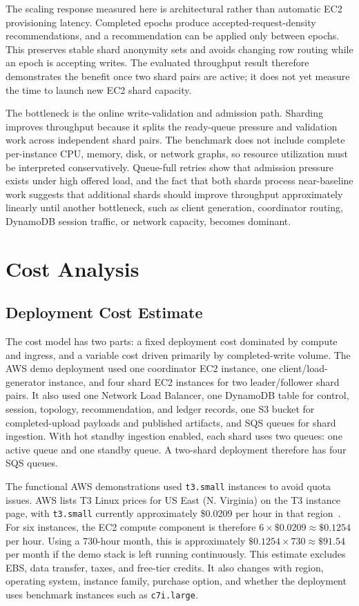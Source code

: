 \documentclass[conference]{IEEEtran}
\begin{document}
The scaling response measured here is architectural rather than automatic EC2 provisioning latency. Completed epochs produce accepted-request-density recommendations, and a recommendation can be applied only between epochs. This preserves stable shard anonymity sets and avoids changing row routing while an epoch is accepting writes. The evaluated throughput result therefore demonstrates the benefit once two shard pairs are active; it does not yet measure the time to launch new EC2 shard capacity.

The bottleneck is the online write-validation and admission path. Sharding improves throughput because it splits the ready-queue pressure and validation work across independent shard pairs. The benchmark does not include complete per-instance CPU, memory, disk, or network graphs, so resource utilization must be interpreted conservatively. Queue-full retries show that admission pressure exists under high offered load, and the fact that both shards process near-baseline work suggests that additional shards should improve throughput approximately linearly until another bottleneck, such as client generation, coordinator routing, DynamoDB session traffic, or network capacity, becomes dominant.

\section{Cost Analysis}

\subsection{Deployment Cost Estimate}

The cost model has two parts: a fixed deployment cost dominated by compute and ingress, and a variable cost driven primarily by completed-write volume. The AWS demo deployment used one coordinator EC2 instance, one client/load-generator instance, and four shard EC2 instances for two leader/follower shard pairs. It also used one Network Load Balancer, one DynamoDB table for control, session, topology, recommendation, and ledger records, one S3 bucket for completed-upload payloads and published artifacts, and SQS queues for shard ingestion. With hot standby ingestion enabled, each shard uses two queues: one active queue and one standby queue. A two-shard deployment therefore has four SQS queues.

The functional AWS demonstrations used \texttt{t3.small} instances to avoid quota issues. AWS lists T3 Linux prices for US East (N. Virginia) on the T3 instance page, with \texttt{t3.small} currently approximately \$0.0209 per hour in that region~\cite{awst3}. For six instances, the EC2 compute component is therefore \(6 \times \$0.0209 \approx \$0.1254\) per hour. Using a 730-hour month, this is approximately \(\$0.1254 \times 730 \approx \$91.54\) per month if the demo stack is left running continuously. This estimate excludes EBS, data transfer, taxes, and free-tier credits. It also changes with region, operating system, instance family, purchase option, and whether the deployment uses benchmark instances such as \texttt{c7i.large}.
\end{document}
